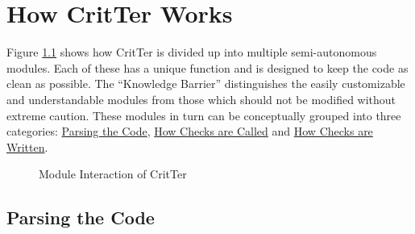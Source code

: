 \documentclass[12pt]{report}
\newcommand{\programName}{CritTer\xspace}
\begin{document}
\chapter{How \programName Works}
\label{howItWorks}

Figure \ref{moduleInteraction} shows how \programName is divided up into multiple semi-autonomous 
modules. Each of these has a unique function and is designed to keep the code as clean as possible. 
The ``Knowledge Barrier'' distinguishes the easily customizable and understandable modules from 
those which should not be modified without extreme caution. These modules in turn can be 
conceptually grouped into three categories: \hyperref[parsingTheCode]{Parsing the Code}, 
\hyperref[howChecksAreCalled]{How Checks are Called} and 
\hyperref[howChecksAreWritten]{How Checks are Written}.

\begin{figure}[h!]
\caption{Module Interaction of \programName}
\label{moduleInteraction}
\begin{center}
\end{center}
\end{figure}

\section{Parsing the Code}
\label{parsingTheCode}
\end{document}
